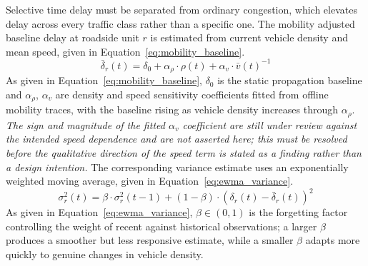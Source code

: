 \documentclass[final,5p,twocolumn]{elsarticle}
\theoremstyle{remark}
\theoremstyle{plain}
\begin{document}
Selective time delay must be separated from ordinary congestion, which
elevates delay across every traffic class rather than a specific one. The
mobility adjusted baseline delay at roadside unit $r$ is estimated from
current vehicle density and mean speed, given in
Equation~\eqref{eq:mobility_baseline}.
\begin{equation}
	\bar{\delta}_r(t) = \delta_0 + \alpha_\rho \cdot \rho(t) + \alpha_v \cdot \bar{v}(t)^{-1}
	\label{eq:mobility_baseline}
\end{equation}
As given in Equation~\eqref{eq:mobility_baseline}, $\delta_0$ is the static
propagation baseline and $\alpha_\rho$, $\alpha_v$ are density and speed
sensitivity coefficients fitted from offline mobility traces, with the
baseline rising as vehicle density increases through $\alpha_\rho$.
\emph{The sign and magnitude of the fitted $\alpha_v$ coefficient are still
under review against the intended speed dependence and are not asserted
here; this must be resolved before the qualitative direction of the speed
term is stated as a finding rather than a design intention.} The
corresponding variance estimate uses an exponentially weighted moving
average, given in Equation~\eqref{eq:ewma_variance}.
\begin{equation}
	\sigma_r^2(t) = \beta \cdot \sigma_r^2(t-1) + (1-\beta) \cdot \left(\delta_r(t) - \bar{\delta}_r(t)\right)^2
	\label{eq:ewma_variance}
\end{equation}
As given in Equation~\eqref{eq:ewma_variance}, $\beta \in (0,1)$ is the
forgetting factor controlling the weight of recent against historical
observations; a larger $\beta$ produces a smoother but less responsive
estimate, while a smaller $\beta$ adapts more quickly to genuine changes in
vehicle density.
\end{document}
